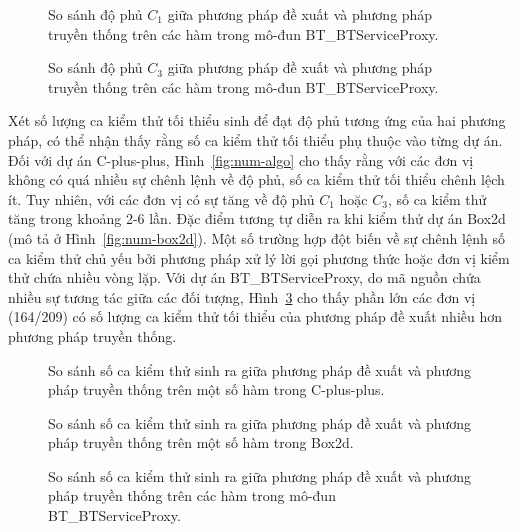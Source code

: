 \begin{figure}[H]
	\centering
	
	\caption{So sánh độ phủ $C_1$ giữa phương pháp đề xuất và phương pháp truyền thống trên các hàm trong mô-đun BT\_BTServiceProxy.}
	\label{fig:c1-serviceproxy}
\end{figure}

\begin{figure}[H]
	\centering
	
	\caption{So sánh độ phủ $C_3$ giữa phương pháp đề xuất và phương pháp truyền thống trên các hàm trong mô-đun BT\_BTServiceProxy.}
	\label{fig:c3-serviceproxy}
\end{figure}

Xét số lượng ca kiểm thử tối thiểu sinh để đạt độ phủ tương ứng của hai phương pháp, có thể nhận thấy rằng số ca kiểm thử tối thiểu phụ thuộc vào từng dự án. Đối với dự án C-plus-plus, Hình~\ref{fig:num-algo} cho thấy rằng với các đơn vị không có quá nhiều sự chênh lệnh về độ phủ, số ca kiểm thử tối thiểu chênh lệch ít. Tuy nhiên, với các đơn vị có sự tăng về độ phủ $C_1$ hoặc $C_3$, số ca kiểm thử tăng trong khoảng 2-6 lần. Đặc điểm tương tự diễn ra khi kiểm thử dự án Box2d (mô tả ở Hình~\ref{fig:num-box2d}). Một số trường hợp đột biến về sự chênh lệnh số ca kiểm thử chủ yếu bởi phương pháp xử lý lời gọi phương thức hoặc đơn vị kiểm thử chứa nhiều vòng lặp. Với dự án BT\_BTServiceProxy, do mã nguồn chứa nhiều sự tương tác giữa các đối tượng, Hình~\ref{fig:num-serviceproxy} cho thấy phần lớn các đơn vị (164/209) có số lượng ca kiểm thử tối thiểu của phương pháp đề xuất nhiều hơn phương pháp truyền thống.

\begin{figure}[H]
    \centering
    
    \caption{So sánh số ca kiểm thử sinh ra giữa phương pháp đề xuất và phương pháp truyền thống trên một số hàm trong C-plus-plus.}
    \label{fig:num-algo}
    
	
	\caption{So sánh số ca kiểm thử sinh ra giữa phương pháp đề xuất và phương pháp truyền thống trên một số hàm trong Box2d.}
	\label{fig:num-box2d}

	
	\caption{So sánh số ca kiểm thử sinh ra giữa phương pháp đề xuất và phương pháp truyền thống trên các hàm trong mô-đun BT\_BTServiceProxy.}
	\label{fig:num-serviceproxy}
\end{figure}

